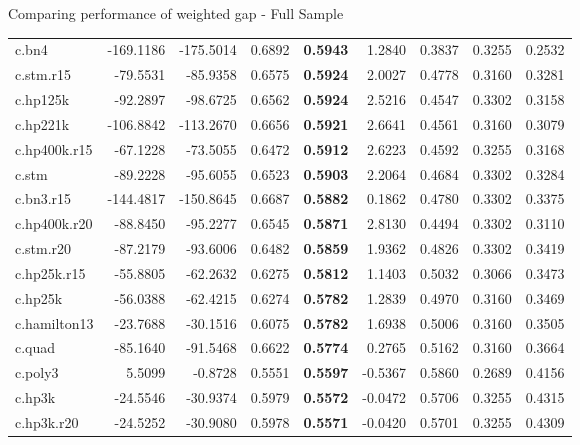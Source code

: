 \documentclass[
  ignorenonframetext,
]{beamer}
\begin{document}
\begin{frame}{Comparing performance of weighted gap - Full Sample}
{\begin{tabular}[t]{lrrr>{}rrrrr}
\addlinespace
c.bn4 & -169.1186 & -175.5014 & 0.6892 & \textbf{0.5943} & 1.2840 & 0.3837 & 0.3255 & 0.2532\\
c.stm.r15 & -79.5531 & -85.9358 & 0.6575 & \textbf{0.5924} & 2.0027 & 0.4778 & 0.3160 & 0.3281\\
c.hp125k & -92.2897 & -98.6725 & 0.6562 & \textbf{0.5924} & 2.5216 & 0.4547 & 0.3302 & 0.3158\\
c.hp221k & -106.8842 & -113.2670 & 0.6656 & \textbf{0.5921} & 2.6641 & 0.4561 & 0.3160 & 0.3079\\
c.hp400k.r15 & -67.1228 & -73.5055 & 0.6472 & \textbf{0.5912} & 2.6223 & 0.4592 & 0.3255 & 0.3168\\
\addlinespace
c.stm & -89.2228 & -95.6055 & 0.6523 & \textbf{0.5903} & 2.2064 & 0.4684 & 0.3302 & 0.3284\\
c.bn3.r15 & -144.4817 & -150.8645 & 0.6687 & \textbf{0.5882} & 0.1862 & 0.4780 & 0.3302 & 0.3375\\
c.hp400k.r20 & -88.8450 & -95.2277 & 0.6545 & \textbf{0.5871} & 2.8130 & 0.4494 & 0.3302 & 0.3110\\
c.stm.r20 & -87.2179 & -93.6006 & 0.6482 & \textbf{0.5859} & 1.9362 & 0.4826 & 0.3302 & 0.3419\\
c.hp25k.r15 & -55.8805 & -62.2632 & 0.6275 & \textbf{0.5812} & 1.1403 & 0.5032 & 0.3066 & 0.3473\\
\addlinespace
c.hp25k & -56.0388 & -62.4215 & 0.6274 & \textbf{0.5782} & 1.2839 & 0.4970 & 0.3160 & 0.3469\\
c.hamilton13 & -23.7688 & -30.1516 & 0.6075 & \textbf{0.5782} & 1.6938 & 0.5006 & 0.3160 & 0.3505\\
c.quad & -85.1640 & -91.5468 & 0.6622 & \textbf{0.5774} & 0.2765 & 0.5162 & 0.3160 & 0.3664\\
c.poly3 & 5.5099 & -0.8728 & 0.5551 & \textbf{0.5597} & -0.5367 & 0.5860 & 0.2689 & 0.4156\\
c.hp3k & -24.5546 & -30.9374 & 0.5979 & \textbf{0.5572} & -0.0472 & 0.5706 & 0.3255 & 0.4315\\
\addlinespace
c.hp3k.r20 & -24.5252 & -30.9080 & 0.5978 & \textbf{0.5571} & -0.0420 & 0.5701 & 0.3255 & 0.4309\\
\bottomrule
\end{tabular}}
\end{frame}
\end{document}
